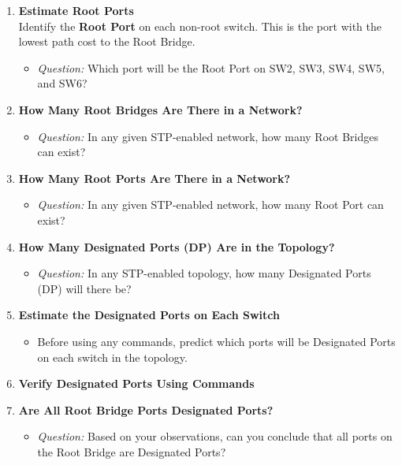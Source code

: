 \documentclass[a4paper]{book}
\begin{document}
\begin{enumerate}
    \item \textbf{Estimate Root Ports} \\
    Identify the \textbf{Root Port} on each non-root switch. This is the port with the lowest path cost to the Root Bridge.
    \begin{itemize}
        \item \textit{Question:} Which port will be the Root Port on SW2, SW3, SW4, SW5, and SW6?
    \end{itemize}
    
    \item \textbf{How Many Root Bridges Are There in a Network?}
    \begin{itemize}
        \item \textit{Question:} In any given STP-enabled network, how many Root Bridges can exist?
    \end{itemize}
    
    \item \textbf{How Many Root Ports Are There in a Network?}
    \begin{itemize}
        \item \textit{Question:} In any given STP-enabled network, how many Root Port can exist?
    \end{itemize}


    \item \textbf{How Many Designated Ports (DP) Are in the Topology?}
    \begin{itemize}
        \item \textit{Question:} In any STP-enabled topology, how many Designated Ports (DP) will there be?
    \end{itemize}

    \item \textbf{Estimate the Designated Ports on Each Switch}
    \begin{itemize}
        \item Before using any commands, predict which ports will be Designated Ports on each switch in the topology. 
    \end{itemize}

    \item \textbf{Verify Designated Ports Using Commands}

    \item \textbf{Are All Root Bridge Ports Designated Ports?}
    \begin{itemize}
        \item \textit{Question:} Based on your observations, can you conclude that all ports on the Root Bridge are Designated Ports?
    \end{itemize}


\end{enumerate}
\end{document}
